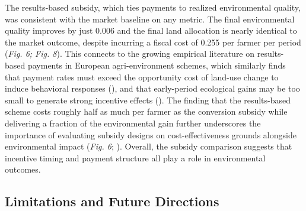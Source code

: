 \documentclass{article}
\begin{document}
The results-based subsidy, which ties payments to realized environmental quality, was consistent with  the market baseline on any metric. The final environmental quality improves by just 0.006 and the final land allocation is nearly identical to the market outcome, despite incurring a fiscal cost of 0.255 per farmer per period (\textit{Fig. 6; Fig. 8}). This connects to the growing empirical literature on results-based payments in European agri-environment schemes, which similarly finds that payment rates must exceed the opportunity cost of land-use change to induce behavioral responses (\cite{brafield2024age}), and that early-period ecological gains may be too small to generate strong incentive effects (\cite{boix2023green}). The finding that the results-based scheme costs roughly half as much per farmer as the conversion subsidy while delivering a fraction of the environmental gain further underscores the importance of evaluating subsidy designs on cost-effectiveness grounds alongside environmental impact (\textit{Fig. 6}; \cite{lambin2011global}). Overall, the subsidy comparison suggests that incentive timing and payment structure all play a role in environmental outcomes.

\subsection{Limitations and Future Directions}
\end{document}
